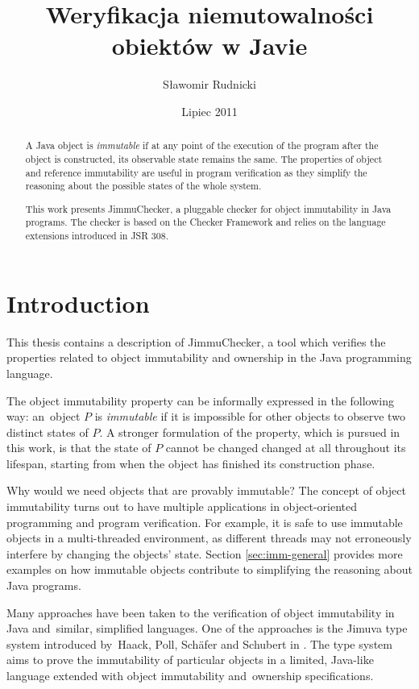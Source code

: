 \documentclass{pracamgr}
\author{Sławomir Rudnicki}
\title{Weryfikacja niemutowalności obiektów w Javie}
\date{Lipiec 2011}
\theoremstyle{break}
\theoremstyle{break}
\theoremstyle{break}
\begin{document}
\maketitle

\begin{abstract}
  A Java object is \emph{immutable} if at any point of the execution
  of the program after the object is constructed, its observable state
  remains the same. The properties of object and reference
  immutability are useful in program verification as they simplify the
  reasoning about the possible states of the whole system. 

  This work presents JimmuChecker, a pluggable checker for object
  immutability in Java programs. The checker is based on the Checker
  Framework and relies on the language extensions introduced in
  JSR 308.
\end{abstract}

\tableofcontents

\chapter{Introduction}
\label{chap:intro}

This thesis contains a description of JimmuChecker, a tool which
verifies the properties related to object immutability and ownership
in the Java programming language.

The object immutability property can be informally expressed in the
following way: an~object $P$ is \emph{immutable} if it is impossible
for other objects to observe two distinct states of $P$. A stronger
formulation of the property, which is pursued in this work, is that
the state of $P$ cannot be changed changed at all throughout its
lifespan, starting from when the object has finished its construction
phase.

Why would we need objects that are provably immutable? The concept of
object immutability turns out to have multiple applications in
object-oriented programming and program verification. For example, it
is safe to use immutable objects in a multi-threaded environment, as
different threads may not erroneously interfere by changing the
objects' state. Section \ref{sec:imm-general} provides more examples
on how immutable objects contribute to simplifying the reasoning about
Java programs.

Many approaches have been taken to the verification of object
immutability in Java and~similar, simplified languages. One of the
approaches is the Jimuva type system introduced by~Haack, Poll,
Schäfer and Schubert in \cite{haack}. The type system aims to prove
the im\-mu\-ta\-bi\-li\-ty of particular objects in a limited,
Java-like language extended with object immutability and~ownership
specifications.
\end{document}
